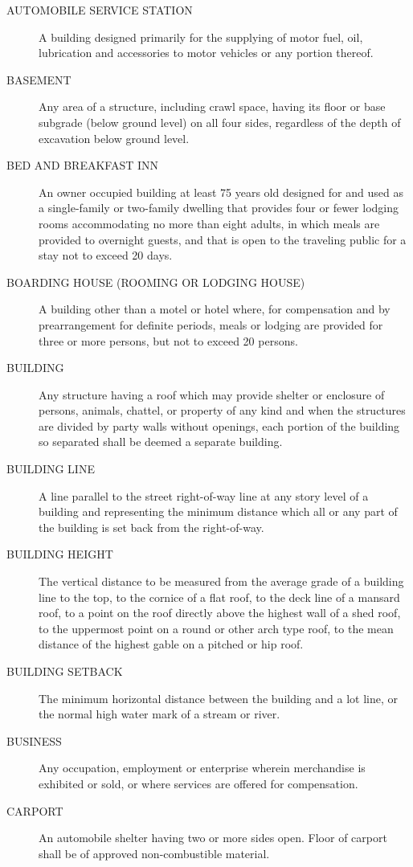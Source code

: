 \begin{description}
    \item[AUTOMOBILE SERVICE STATION] A building designed primarily for the supplying of motor fuel, oil, lubrication and accessories to motor vehicles or any portion thereof.
    \item[BASEMENT] Any area of a structure, including crawl space, having its floor or base subgrade (below ground level) on all four sides, regardless of the depth of excavation below ground level.
    \item[BED AND BREAKFAST INN] An owner occupied building at least 75 years old designed for and used as a single-family or two-family dwelling that provides four or fewer lodging rooms accommodating no more than eight adults, in which meals are provided to overnight guests, and that is open to the traveling public for a stay not to exceed 20 days.
    \item[BOARDING HOUSE (ROOMING OR LODGING HOUSE)] A building other than a motel or hotel where, for compensation and by prearrangement for definite periods, meals or lodging are provided for three or more persons, but not to exceed 20 persons.
    \item[BUILDING] Any structure having a roof which may provide shelter or enclosure of persons, animals, chattel, or property of any kind and when the structures are divided by party walls without openings, each portion of the building so separated shall be deemed a separate building.
    \item[BUILDING LINE] A line parallel to the street right-of-way line at any story level of a building and representing the minimum distance which all or any part of the building is set back from the right-of-way.
    \item[BUILDING HEIGHT] The vertical distance to be measured from the average grade of a building line to the top, to the cornice of a flat roof, to the deck line of a mansard roof, to a point on the roof directly above the highest wall of a shed roof, to the uppermost point on a round or other arch type roof, to the mean distance of the highest gable on a pitched or hip roof.
    \item[BUILDING SETBACK] The minimum horizontal distance between the building and a lot line, or the normal high water mark of a stream or river.
    \item[BUSINESS] Any occupation, employment or enterprise wherein merchandise is exhibited or sold, or where services are offered for compensation.
    \item[CARPORT] An automobile shelter having two or more sides open. Floor of carport shall be of approved non-combustible material.

\end{description}
